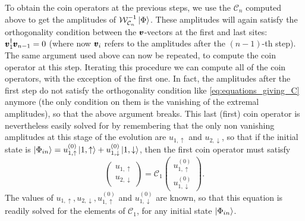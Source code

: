 To obtain the coin operators at the previous steps, we use the $\mathcal C_n$ computed above to get the amplitudes of $\mathcal W_{\mathcal C_n}^{-1} \ket\Phi$.
These amplitudes will again satisfy the orthogonality condition between the $\pmb{v}$-vectors at the first and last sites:
${\pmb{v}_1^\dagger \pmb{v}_{n-1} = 0}$
(where now $\pmb{v}_i$ refers to the amplitudes after the $(n-1)$-th step).
The same argument used above can now be repeated, to compute the coin operator at this step.
Iterating this procedure we can compute all of the coin operators, with the exception of the first one.
In fact, the amplitudes after the first step do not satisfy the orthogonality condition like \cref{eq:equations_giving_C} anymore (the only condition on them is the vanishing of the extremal amplitudes), so that the above argument breaks.
This last (first) coin operator is nevertheless easily solved for by remembering that the only non vanishing amplitudes at this stage of the evolution are $u_{1,\uparrow}$ and $u_{2, \downarrow}$, so that if the initial state is
${\ket{\Phi_{in}} = u^{(0)}_{1,\uparrow} \ket{1, \uparrow} + u^{(0)}_{1, \downarrow} \ket{1, \downarrow}}$, then the first coin operator must satisfy
\begin{equation}
	\begin{pmatrix}
		u_{1, \uparrow} \\ u_{2,\downarrow}
	\end{pmatrix}
	= \mathcal C_1
	\begin{pmatrix}
		u^{(0)}_{1, \uparrow} \\ u^{(0)}_{1, \downarrow}
	\end{pmatrix}.
\end{equation}
The values of $u_{1, \uparrow}, u_{2,\downarrow}, u^{(0)}_{1, \uparrow}$ and $u^{(0)}_{1, \downarrow}$ are known, so that this equation is readily solved for the elements of $\mathcal C_1$, for any initial state $\ket{\Phi_{in}}$.

